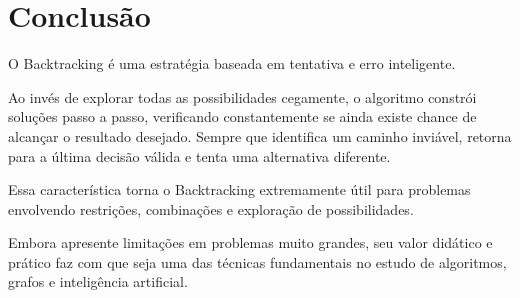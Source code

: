 \section{Conclusão}

O Backtracking é uma estratégia baseada em tentativa e erro inteligente.

Ao invés de explorar todas as possibilidades cegamente, o algoritmo constrói soluções passo a passo, verificando constantemente se ainda existe chance de alcançar o resultado desejado. Sempre que identifica um caminho inviável, retorna para a última decisão válida e tenta uma alternativa diferente.

Essa característica torna o Backtracking extremamente útil para problemas envolvendo restrições, combinações e exploração de possibilidades.

Embora apresente limitações em problemas muito grandes, seu valor didático e prático faz com que seja uma das técnicas fundamentais no estudo de algoritmos, grafos e inteligência artificial.
